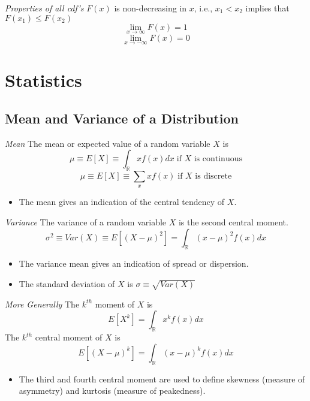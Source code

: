 \emph{Properties of all cdf's}
   $F(x)$ is non-decreasing in $x$, i.e., $x_{1} < x_{2}$ implies that $F(x_{1}) \le F(x_{2})$
   \begin{equation*}
    \lim_{x \to \infty} F(x) = 1
   \end{equation*}
   \begin{equation*}
    \lim_{x \to -\infty} F(x) = 0
   \end{equation*}  


\section{Statistics}

\subsection{Mean and Variance of a Distribution}

\emph{Mean}
  The mean or expected value of a random variable $X$ is
  \begin{equation*}
    \mu \equiv E[X] \equiv \int_{\mathbb{R}}xf(x)dx \; \textrm{if $X$ is continuous}
  \end{equation*}
  \begin{equation*}
    \mu \equiv E[X] \equiv \sum_{x}xf(x) \; \textrm{if $X$ is discrete}
  \end{equation*}
  \begin{itemize}
   \item The mean gives an indication of the central tendency of $X$.
  \end{itemize}


\emph{Variance}
  The variance of a random variable $X$ is the second central moment.
  \begin{equation*}
    \sigma^{2} \equiv Var(X) \equiv E[(X-\mu)^{2}] = \int_{\mathbb{R}}(x-\mu)^{2}f(x)dx
  \end{equation*}
  \begin{itemize}
   \item The variance mean gives an indication of spread or dispersion.
   \item The standard deviation of $X$ is $\sigma \equiv \sqrt{Var(X)}$
  \end{itemize}


\emph{More Generally}
  The $k^{th}$ moment of $X$ is
  \begin{equation*}
    E[X^k] = \int_{\mathbb{R}}x^k f(x) dx
  \end{equation*}
  The $k^{th}$ central moment of $X$ is
  \begin{equation*}
    E[(X-\mu)^k] = \int_{\mathbb{R}}(x-\mu)^k f(x) dx
  \end{equation*}
  \begin{itemize}
   \item The third and fourth central moment are used to define skewness (measure of asymmetry) and kurtosis (measure of peakedness).
  \end{itemize}


